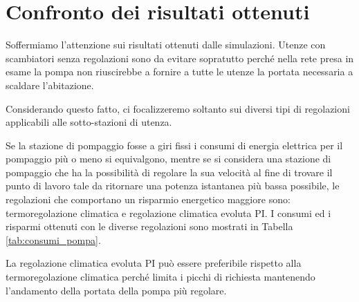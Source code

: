 \documentclass[laurea,oneside,11pt]{USiena_tesiLM}
\begin{document}
\section{Confronto dei risultati ottenuti}

Soffermiamo l'attenzione sui risultati ottenuti dalle simulazioni. Utenze con scambiatori senza regolazioni sono da evitare sopratutto perché nella rete presa in esame la pompa non riuscirebbe a fornire a tutte le utenze la portata necessaria a scaldare l'abitazione.

Considerando questo fatto, ci focalizzeremo soltanto sui diversi tipi di regolazioni applicabili alle sotto-stazioni di utenza. 

Se la stazione di pompaggio fosse a giri fissi i consumi di energia elettrica per il pompaggio più o meno si equivalgono, mentre se si considera una stazione di pompaggio che ha la possibilità di regolare la sua velocità al fine di trovare il punto di lavoro tale da ritornare una potenza istantanea più bassa possibile, le regolazioni che comportano un risparmio energetico maggiore sono: termoregolazione climatica e regolazione climatica evoluta PI. I consumi ed i risparmi ottenuti con le diverse regolazioni sono mostrati in Tabella \ref{tab:consumi_pompa}.

La regolazione climatica evoluta PI può essere preferibile rispetto alla termoregolazione climatica perché limita i picchi di richiesta mantenendo l'andamento della portata della pompa più regolare.
 
\end{document}
